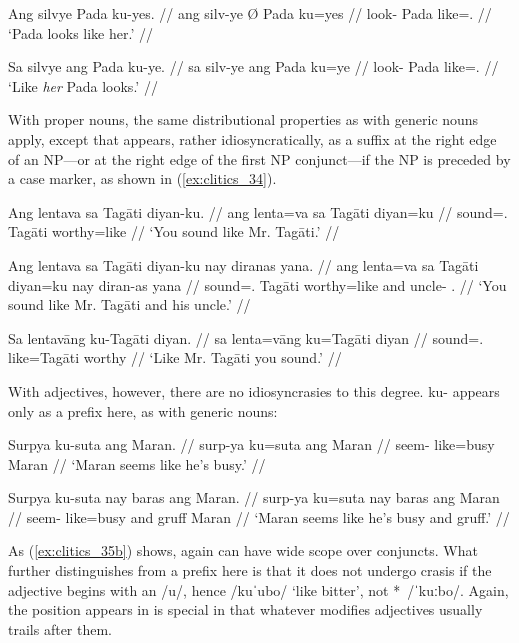 \pex\label{ex:clitics_33}
\a\label{ex:clitics_33a}\begingl
	\gla Ang silvye {} Pada ku-yes. //
	\glb ang silv-ye Ø Pada ku=yes //
	\glc \AgtT{} look-\TsgF{} \Top{} Pada like=\TsgF{}.\Parg{} //
	\glft `Pada looks like her.' //
\endgl

\a\label{ex:clitics_33b}\begingl
	\gla Sa silvye ang Pada ku-ye. //
	\glb sa silv-ye ang Pada ku=ye //
	\glc \PatT{} look-\TsgF{} \Aarg{} Pada like=\TsgF{}.\Top{} //
	\glft `Like \emph{her} Pada looks.' //
\endgl
\xe

With proper nouns, the same distributional properties as with generic nouns
apply, except that  appears, rather idiosyncratically, as a
suffix at the right edge of an NP---or at the right edge of the first NP
conjunct---if the NP is preceded by a case marker, as shown in
(\ref{ex:clitics_34}).

\pex\label{ex:clitics_34}
\a\label{ex:clitics_34a}\begingl
	\gla Ang lentava sa Tagāti diyan-ku. //
	\glb ang lenta=va sa Tagāti diyan=ku //
	\glc \AgtT{} sound=\Second{}.\Top{} \Parg{} Tagāti worthy=like //
	\glft `You sound like Mr. Tagāti.' //
\endgl

\a\label{ex:clitics_34b}\begingl
	\gla Ang lentava sa Tagāti diyan-ku nay diranas yana. //
	\glb ang lenta=va sa Tagāti diyan=ku nay diran-as yana //
	\glc \AgtT{} sound=\Second{}.\Top{} \Parg{} Tagāti worthy=like and 
		uncle-\Parg{} \TsgM{}.\Gen{} //
	\glft `You sound like Mr. Tagāti and his uncle.' //
\endgl

\a\label{ex:clitics_34c}\begingl
	\gla Sa lentavāng ku-​Tagāti diyan. //
	\glb sa lenta=vāng ku=​Tagāti diyan //
	\glc \PatT{} sound=\Second{}.\Aarg{} like=​Tagāti worthy //
	\glft `Like Mr. Tagāti you sound.' //
\endgl
\xe

With adjectives, however, there are no idiosyncrasies to this degree.
 {ku-} appears only as a prefix here, as with generic nouns:

\pex\label{ex:clitics_35}
\a\label{ex:clitics_35a}\begingl
	\gla Surpya ku-suta ang Maran. //
	\glb surp-ya ku=suta ang Maran //
	\glc seem-\TsgM{} like=busy \Aarg{} Maran //
	\glft `Maran seems like he's busy.' //
\endgl

\a\label{ex:clitics_35b}\begingl
	\gla Surpya ku-suta nay baras ang Maran. //
	\glb surp-ya ku=suta nay baras ang Maran //
	\glc seem-\TsgM{} like=busy and gruff \Aarg{} Maran //
	\glft `Maran seems like he's busy and gruff.' //
\endgl
\xe

As (\ref{ex:clitics_35b}) shows,  again can have wide scope over
conjuncts. What further distinguishes  from a prefix here is
that it does not undergo crasis if the adjective begins with an /u/, hence
 /kuˈubo/ `like bitter', not *\,
/ˈkuːbo/. Again, the position  appears in is special in that
whatever modifies adjectives usually trails after them.


